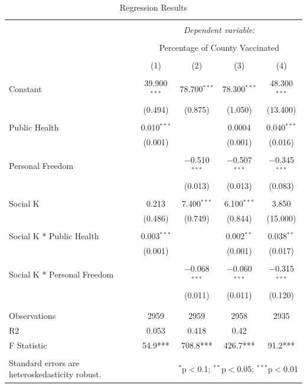 \documentclass[
]{article}
\begin{document}
\begin{table}[!htbp] \centering 
  \caption{Regression Results} 
  \label{} 
\begin{tabular}{@{\extracolsep{5pt}}lcccc} 
\\[-1.8ex]\hline 
\hline \\[-1.8ex] 
 & \multicolumn{4}{c}{\textit{Dependent variable:}} \\ 
\cline{2-5} 
\\[-1.8ex] & \multicolumn{4}{c}{Percentage of County Vaccinated} \\ 
\\[-1.8ex] & (1) & (2) & (3) & (4)\\ 
\hline \\[-1.8ex] 
 Constant & 39.900$^{***}$ & 78.700$^{***}$ & 78.300$^{***}$ & 48.300$^{***}$ \\ 
  & (0.494) & (0.875) & (1.050) & (13.400) \\ 
  & & & & \\ 
 Public Health & 0.010$^{***}$ &  & 0.0004 & 0.040$^{***}$ \\ 
  & (0.001) &  & (0.001) & (0.016) \\ 
  & & & & \\ 
 Personal Freedom &  & $-$0.510$^{***}$ & $-$0.507$^{***}$ & $-$0.345$^{***}$ \\ 
  &  & (0.013) & (0.013) & (0.083) \\ 
  & & & & \\ 
 Social K & 0.213 & 7.400$^{***}$ & 6.100$^{***}$ & 3.850 \\ 
  & (0.486) & (0.749) & (0.844) & (15.000) \\ 
  & & & & \\ 
 Social K * Public Health & 0.003$^{***}$ &  & 0.002$^{**}$ & 0.038$^{**}$ \\ 
  & (0.001) &  & (0.001) & (0.017) \\ 
  & & & & \\ 
 Social K * Personal Freedom &  & $-$0.068$^{***}$ & $-$0.060$^{***}$ & $-$0.315$^{***}$ \\ 
  &  & (0.011) & (0.011) & (0.120) \\ 
  & & & & \\ 
\hline \\[-1.8ex] 
Observations & 2959 & 2959 & 2958 & 2935 \\ 
R2 & 0.053 & 0.418 & 0.42 &  \\ 
F Statistic & 54.9*** & 708.8*** & 426.7*** & 91.2*** \\ 
\hline 
\hline \\[-1.8ex] 
Standard errors are heteroskedasticity robust. & \multicolumn{4}{r}{$^{*}$p$<$0.1; $^{**}$p$<$0.05; $^{***}$p$<$0.01} \\ 
\end{tabular} 
\end{table}
\end{document}
